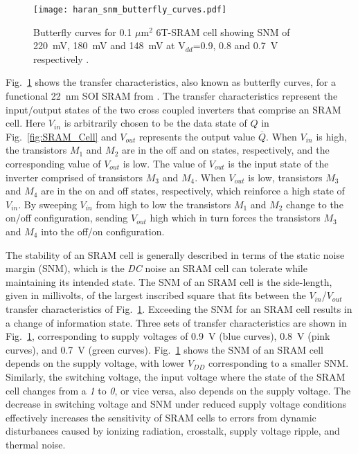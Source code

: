 \begin{figure}[tb]
    \begin{center}
        \texttt{[image: haran\_snm\_butterfly\_curves.pdf]}
    \end{center}
    \caption[Butterfly curves for 0.1 $\mu$m$^2$ 6T-SRAM cell showing SNM of 220~mV, 180~mV and 148~mV at V$_{dd}$=0.9, 0.8 and 0.7~V respectively.]{Butterfly curves for 0.1 $\mu$m$^2$ 6T-SRAM cell showing SNM of 220~mV, 180~mV and 148~mV at V$_{dd}$=0.9, 0.8 and 0.7~V respectively \cite{Haran:2008ta}.}
    \label{fig:22nm_soi_sram_butterfly_curve_snm}
\end{figure}

Fig.~\ref{fig:22nm_soi_sram_butterfly_curve_snm} shows the transfer characteristics, also known as butterfly curves, for a functional 22~nm SOI SRAM from \cite{Haran:2008ta}.
The transfer characteristics represent the input/output states of the two cross coupled inverters that comprise an SRAM cell.
Here $V_{in}$ is arbitrarily chosen to be the data state of $Q$ in Fig.~\ref{fig:SRAM_Cell} and $V_{out}$ represents the output value $\overline{Q}$. 
When $V_{in}$ is high, the transistors $M_1$ and $M_2$ are in the off and on states, respectively, and the corresponding value of $V_{out}$ is low.
The value of $V_{out}$ is the input state of the inverter comprised of transistors $M_3$ and $M_4$. 
When $V_{out}$ is low, transistors $M_3$ and $M_4$ are in the on and off states, respectively, which reinforce a high state of $V_{in}$.
By sweeping $V_{in}$ from high to low the transistors $M_1$ and $M_2$ change to the on/off configuration, sending $V_{out}$ high which in turn forces the transistors $M_3$ and $M_4$ into the off/on configuration.

The stability of an SRAM cell is generally described in terms of the static noise margin (SNM), which is the \emph{DC} noise an SRAM cell can tolerate while maintaining its intended state.
The SNM of an SRAM cell is the side-length, given in millivolts, of the largest inscribed square that fits between the $V_{in}$/$V_{out}$transfer characteristics of Fig.~\ref{fig:22nm_soi_sram_butterfly_curve_snm}.
Exceeding the SNM for an SRAM cell results in a change of information state.
Three sets of transfer characteristics are shown in Fig.~\ref{fig:22nm_soi_sram_butterfly_curve_snm}, corresponding to supply voltages of 0.9~V (blue curves), 0.8~V (pink curves), and 0.7~V (green curves).
Fig.~\ref{fig:22nm_soi_sram_butterfly_curve_snm} shows the SNM of an SRAM cell depends on the supply voltage, with lower $V_{DD}$ corresponding to a smaller SNM.
Similarly, the switching voltage, the input voltage where the state of the SRAM cell changes from a \emph{1} to \emph{0}, or vice versa, also depends on the supply voltage.
The decrease in switching voltage and SNM under reduced supply voltage conditions effectively increases the sensitivity of SRAM cells to errors from dynamic disturbances caused by ionizing radiation, crosstalk, supply voltage ripple, and thermal noise.

